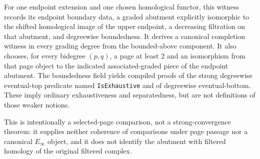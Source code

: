 \begin{definition}
  \label{def:page-abutment-comparison-witness}
  \leanok
  For one endpoint extension and one chosen homological functor, this witness
  records its endpoint boundary data, a graded abutment explicitly isomorphic
  to the shifted homological image of the upper endpoint, a decreasing
  filtration on that abutment, and degreewise boundedness.  It derives a
  canonical completion witness in every grading degree from the bounded-above
  component.  It also chooses, for every bidegree $(p,q)$, a page at least $2$
  and an isomorphism from that page object to the indicated associated-graded
  piece of the endpoint abutment.  The boundedness field yields compiled proofs
  of the strong degreewise eventual-top predicate named
  \texttt{IsExhaustive} and of degreewise eventual-bottom.  These imply
  ordinary exhaustiveness and separatedness, but are not definitions of those
  weaker notions.

  This is intentionally a selected-page comparison, not a strong-convergence
  theorem: it supplies neither coherence of comparisons under page passage nor
  a canonical $E_\infty$ object, and it does not identify the abutment with
  filtered homology of the original filtered complex.
\end{definition}


